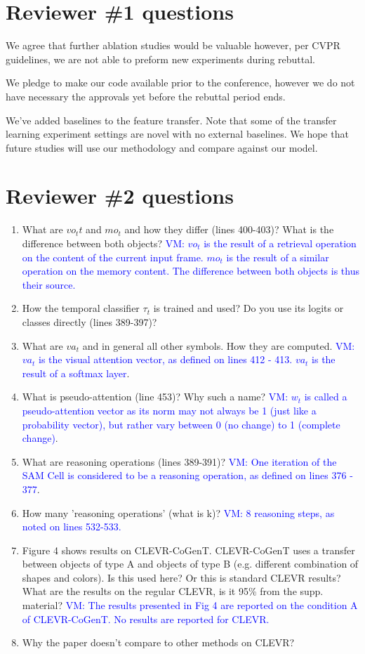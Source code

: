 \documentclass[10pt,twocolumn,letterpaper]{article}
\newcommand{\vm}[1]{\textcolor{blue}{VM: #1}}
\begin{document}
\section{Reviewer \#1 questions}

We agree that further ablation studies would be valuable however, per CVPR guidelines, we are not able to preform new experiments during rebuttal.

We pledge to make our code available prior to the conference, however we do not have necessary the approvals yet before the rebuttal period ends.

We've added baselines to the feature transfer. Note that some of the transfer learning experiment settings are novel with no external baselines. We hope that future studies will use our methodology and compare against our model.

\section{Reviewer \#2 questions}

\begin{enumerate}
  \item What are $vo_tt$ and $mo_t$ and how they differ (lines 400-403)? What is the difference between both objects? \vm{$vo_t$ is the result of a retrieval operation on the content of the current input frame. $mo_t$ is the result of a similar operation on the memory content. The difference between both objects is thus their source.}

  \item How the temporal classifier $\tau_t$ is trained and used? Do you use its logits or classes directly (lines 389-397)?
  \item What are $va_t$ and in general all other symbols. How they are computed. \vm{$va_t$ is the visual attention vector, as defined on lines 412 - 413. $va_t$ is the result of a softmax layer}.
  \item What is pseudo-attention (line 453)? Why such a name? \vm{$w_t$ is called a pseudo-attention vector as its norm may not always be 1 (just like a probability vector), but rather vary between 0 (no change) to 1 (complete change)}.
  \item What are reasoning operations (lines 389-391)? \vm{One iteration of the SAM Cell is considered to be a reasoning operation, as defined on lines 376 - 377}.
  \item How many 'reasoning operations' (what is k)? \vm{8 reasoning steps, as noted on lines 532-533.}
  \item Figure 4 shows results on CLEVR-CoGenT. CLEVR-CoGenT uses a transfer between objects of type A and objects of type B (e.g. different combination of shapes and colors). Is this used here? Or this is standard CLEVR results? What are the results on the regular CLEVR, is it 95\% from the supp. material? \vm{The results presented in Fig 4 are reported on the condition A of CLEVR-CoGenT. No results are reported for CLEVR.}
  \item Why the paper doesn't compare to other methods on CLEVR?
\end{enumerate}
\end{document}
